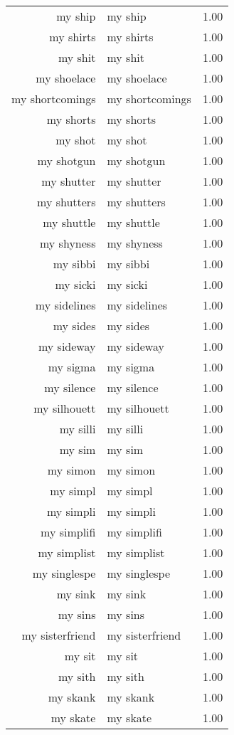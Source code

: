\begin{table}[ht]
\begin{tabular}{rlr}
  my ship & my ship & 1.00 \\ 
  my shirts & my shirts & 1.00 \\ 
  my shit & my shit & 1.00 \\ 
  my shoelace & my shoelace & 1.00 \\ 
  my shortcomings & my shortcomings & 1.00 \\ 
  my shorts & my shorts & 1.00 \\ 
  my shot & my shot & 1.00 \\ 
  my shotgun & my shotgun & 1.00 \\ 
  my shutter & my shutter & 1.00 \\ 
  my shutters & my shutters & 1.00 \\ 
  my shuttle & my shuttle & 1.00 \\ 
  my shyness & my shyness & 1.00 \\ 
  my sibbi & my sibbi & 1.00 \\ 
  my sicki & my sicki & 1.00 \\ 
  my sidelines & my sidelines & 1.00 \\ 
  my sides & my sides & 1.00 \\ 
  my sideway & my sideway & 1.00 \\ 
  my sigma & my sigma & 1.00 \\ 
  my silence & my silence & 1.00 \\ 
  my silhouett & my silhouett & 1.00 \\ 
  my silli & my silli & 1.00 \\ 
  my sim & my sim & 1.00 \\ 
  my simon & my simon & 1.00 \\ 
  my simpl & my simpl & 1.00 \\ 
  my simpli & my simpli & 1.00 \\ 
  my simplifi & my simplifi & 1.00 \\ 
  my simplist & my simplist & 1.00 \\ 
  my singlespe & my singlespe & 1.00 \\ 
  my sink & my sink & 1.00 \\ 
  my sins & my sins & 1.00 \\ 
  my sisterfriend & my sisterfriend & 1.00 \\ 
  my sit & my sit & 1.00 \\ 
  my sith & my sith & 1.00 \\ 
  my skank & my skank & 1.00 \\ 
  my skate & my skate & 1.00 \\ 

\end{tabular}
\end{table}
